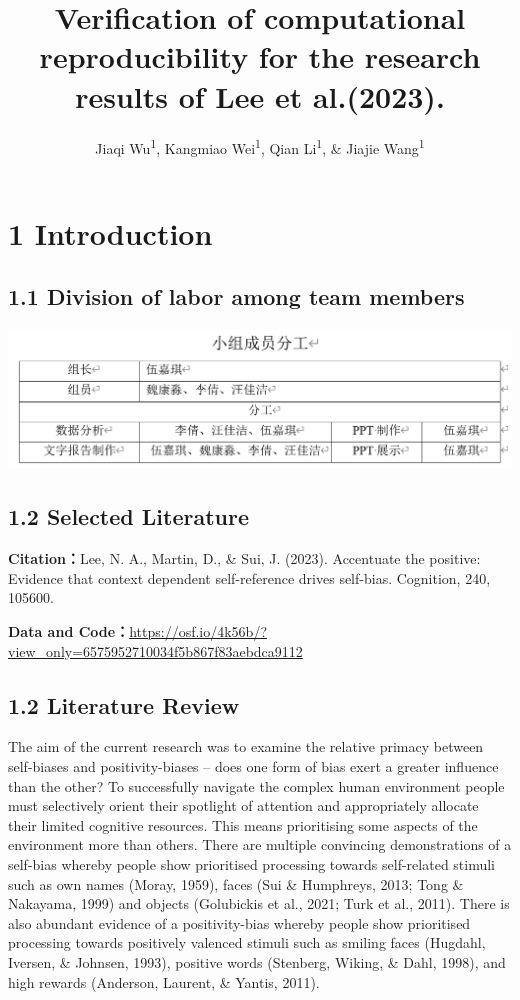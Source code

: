 \documentclass[
  man]{apa6}
\title{Verification of computational reproducibility for the research results of Lee et al.(2023).}
\author{Jiaqi Wu\textsuperscript{1}, Kangmiao Wei\textsuperscript{1}, Qian Li\textsuperscript{1}, \& Jiajie Wang\textsuperscript{1}}
\date{}
\affiliation{\vspace{0.5cm}\textsuperscript{1} Nanjing Normal Unviersity}
\begin{document}
\maketitle

\section{1 Introduction}\label{introduction}

\subsection{1.1 Division of labor among team members}\label{division-of-labor-among-team-members}

\includegraphics{pic/FenGong.png}

\subsection{1.2 Selected Literature}\label{selected-literature}

\textbf{Citation：}Lee, N. A., Martin, D., \& Sui, J. (2023). Accentuate the positive: Evidence that context dependent self-reference drives self-bias. Cognition, 240, 105600.

\textbf{Data and Code：}\url{https://osf.io/4k56b/?view_only=6575952710034f5b867f83aebdca9112}

\subsection{1.2 Literature Review}\label{literature-review}

The aim of the current research was to examine the relative primacy between self-biases and positivity-biases -- does one form of bias exert a greater influence than the other? To successfully navigate the complex human environment people must selectively orient their spotlight of attention and appropriately allocate their limited cognitive resources. This means prioritising some aspects of the environment more than others. There are multiple convincing demonstrations of a self-bias whereby people show prioritised processing towards self-related stimuli such as own names (Moray, 1959), faces (Sui \& Humphreys, 2013; Tong \& Nakayama, 1999) and objects (Golubickis et al., 2021; Turk et al., 2011). There is also abundant evidence of a positivity-bias whereby people show prioritised processing towards positively valenced stimuli such as smiling faces (Hugdahl, Iversen, \& Johnsen, 1993), positive words (Stenberg, Wiking, \& Dahl, 1998), and high rewards (Anderson, Laurent, \& Yantis, 2011).
\end{document}
